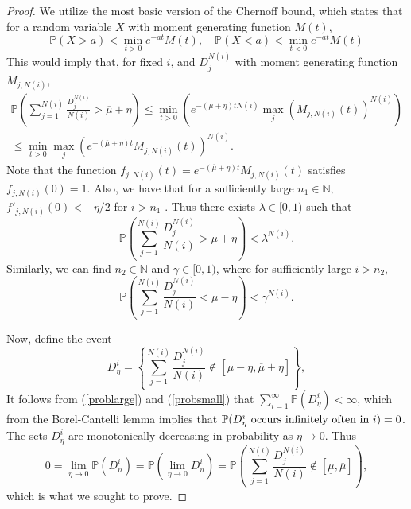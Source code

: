 \begin{proof}
We utilize the most basic version of the Chernoff bound, which states that for a random variable $X$ with moment generating function $M(t)$,  
\begin{equation}
\mathbb{P}(X>a)<\min_{t>0}e^{-at}M(t), \quad  \mathbb{P}(X<a)<\min_{t<0}e^{-at}M(t) \end{equation}
This would imply that, for fixed $i$, and $D_j^{N(i)}$ with moment generating function  $M_{j,N(i)}$,
 \begin{eqnarray}
\mathbb{P}(\sum_{j = 1}^{N(i)} \frac{D_j^{N(i)}}{N(i)}>\overline{\mu}+\eta)\le \min_{t>0} \left(e^{-(\overline{\mu}+\eta)tN(i)} \max _{j}( M_{j,N(i)}(t))^{N(i)}\right) \\ \le\min_{t>0}\max _{j}\left(e^{-(\overline{\mu}+\eta)t}  M_{j,N(i)}(t)\right)^{N(i)}. \nonumber 
\end{eqnarray}
Note that the function $f_{j, N(i)}(t)= e^{-(\overline{\mu}+\eta)t}  M_{j,N(i)}(t)$ satisfies $f_{j, N(i)}(0)= 1.$ Also, we have that for a sufficiently large $n_1\in \mathbb{N}$,   $f'_{j, N(i)}(0)< -\eta/2$ for $i>n_1$ .  Thus there exists $\lambda \in [0,1)$ such that  
\begin{equation} \label{problarge}
\mathbb{P}\left(\sum_{j = 1}^{N(i)} \frac{D_j^{N(i)}}{N(i)}>\overline{\mu}+\eta\right)< \lambda^{N(i)}.
\end{equation}
Similarly, we can find $n_2\in \mathbb{N}$ and $\gamma \in [0,1)$, where for sufficiently large $i>n_{2}$,
\begin{equation} \label{probsmall}
\mathbb{P}\left(\sum_{j = 1}^{N(i)} \frac{D_j^{N(i)}}{N(i)}<\underline{\mu}-\eta\right)< \gamma^{N(i)}.
\end{equation}

Now, define the event
\begin{equation}
D^{i}_\eta= \left\{\sum_{j = 1}^{N(i)} \frac{D_j^{N(i)}}{N(i)} \notin[\underline{\mu}-\eta,\overline{\mu}+\eta]\right\} , 
\end{equation}
It follows from (\ref{problarge}) and (\ref{probsmall}) that 
$\sum_{i = 1}^\infty\mathbb{P}(D^i_\eta) < \infty$, which from the Borel-Cantelli lemma implies that $\mathbb{P}(D_{\eta}^i \hbox{ occurs infinitely often in $i$}) = 0$. The sets $D_\eta^i$ are monotonically decreasing in probability as $\eta \rightarrow 0$. Thus 
\begin{equation}
0=\lim_{\eta \rightarrow 0} \mathbb{P}(D_n^i) =  \mathbb{P}(\lim_{\eta \rightarrow 0}D_n^i) 
= \mathbb{P}\left(\sum_{j = 1}^{N(i)} \frac{D_j^{N(i)}}{N(i)} \notin[\underline{\mu},\overline{\mu}]\right), \end{equation}
which is what we sought to prove. 

\end{proof}


